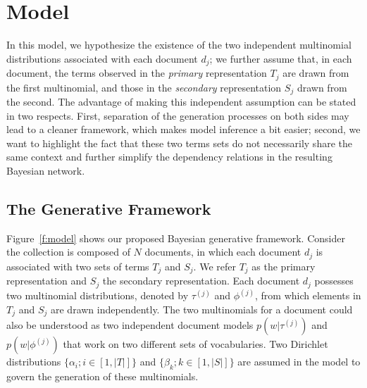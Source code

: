 \section{Model}\label{s:model}


In this model, we hypothesize the existence of the two independent multinomial
distributions associated with each document $d_j$; we further assume that, in
each document, the terms observed in the \emph{primary} representation $T_j$
are drawn from the first multinomial, and those in the \emph{secondary}
representation $S_j$ drawn from the second.  The advantage of making this
independent assumption can be stated in two respects.  First, separation of the
generation processes on both sides may lead to a cleaner framework, which makes
model inference a bit easier; second, we want to highlight the fact that these
two terms sets do not necessarily share the same context and further simplify
the dependency relations in the resulting Bayesian network.  

\subsection{The Generative Framework}

Figure~\ref{f:model} shows our proposed Bayesian generative framework.
Consider the collection is composed of $N$ documents, in which each document
$d_j$ is associated with two sets of terms $T_j$ and $S_j$.  We refer $T_j$ as
the primary representation and $S_j$ the secondary representation.  Each
document $d_j$ possesses two multinomial distributions, denoted by $\tau^{(j)}$
and $\phi^{(j)}$, from which elements in $T_j$ and $S_j$ are drawn
independently.  The two multinomials for a document could also be understood as
two independent document models $p(w|\tau^{(j)})$ and $p(w|\phi^{(j)})$ that
work on two different sets of vocabularies.  Two Dirichlet distributions
$\{\alpha_i; i \in [1, |T|]\}$ and $\{\beta_k; k \in [1, |S|]\}$ are assumed in
the model to govern the generation of these multinomials.  

